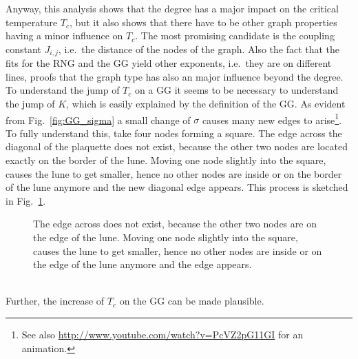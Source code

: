         Anyway, this analysis shows that the degree has a major impact on
        the critical temperature \(T_c\), but it also shows that there
        have to be other graph properties having a minor influence on \(T_{c}\).
        The most promising candidate is the coupling constant \(J_{i,j}\), i.e.\ the
        distance of the nodes of the graph.
        Also the fact that the fits for the RNG and the GG yield other exponents,
        i.e.\ they are on different lines, proofs that the graph type has
        also an major influence beyond the degree.\\
        To understand the jump of \(T_c\) on a GG it seems to be necessary to
        understand the jump of \(K\), which is easily explained
        by the definition of the GG. As evident from Fig.\ \ref{fig:GG_sigma}
        a small change of \(\sigma\) causes many new edges to arise\footnote{See also \url{http://www.youtube.com/watch?v=PcVZ2pG11GI} for an animation.}.
        To fully understand this, take four nodes forming a square. The edge
        across the diagonal of the plaquette does not exist, because the
        other two nodes are located exactly on the border
        of the lune. Moving one node slightly into the square, causes the lune
        to get smaller, hence no other nodes are inside or on the border of
        the lune anymore and the new diagonal edge appears. This process is sketched in
        Fig.\ \ref{fig:GGEdge}.
        \begin{figure}[htb]
            \centering
            \caption[Sketch why Many New Edges Arise at the Transition from $\sigma = 0$ to $\sigma > 0$]
            {
                 The edge across does not exist,
                because the other two nodes are on the edge of the lune.
                 Moving one node slightly into the
                square, causes the lune to get smaller, hence no other nodes
                are inside or on the edge of the lune anymore and the edge
                appears.
            }
            \label{fig:GGEdge}
        \end{figure}\\
        Further, the increase of \(T_c\) on the GG can be made plausible.

